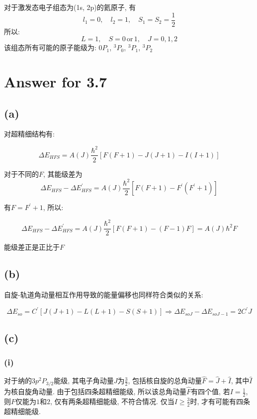 \documentclass[twoside]{article}
\begin{document}
对于激发态电子组态为(1s, 2p)的氦原子, 有
$$
    l_1 = 0, \quad l_2 = 1, \quad S_1 = S_2 = \frac{1}{2}
$$
所以:
$$
    L = 1, \quad S = 0\, \text{or} \, 1, \quad J = 0, 1, 2
$$
该组态所有可能的原子能级为: $0 P_{1}$, $^3 P_{0}$, $^3P_{1}$, $^3P_{2}$

\section*{Answer for 3.7}

\subsection*{(a)}

对超精细结构有:

$$\Delta E_{HFS} = A(J) \frac{\hbar^2}{2} \left[F(F+1) - J(J+1) - I(I+1)\right]$$

对于不同的$F$, 其能级差为
$$\Delta E_{HFS} - \Delta E_{HFS}^\prime =  A(J) \frac{\hbar^2}{2} \left[F(F+1) - F^\prime(F^\prime + 1)\right]$$

有$F = F^\prime + 1$, 所以:

$$\Delta E_{HFS} - \Delta E_{HFS}^\prime =  A(J) \frac{\hbar^2}{2} \left[F(F+1) - (F - 1)F\right] = A(J) \hbar^2 F $$

能级差正是正比于$F$

\subsection*{(b)}

自旋-轨道角动量相互作用导致的能量偏移也同样符合类似的关系:

$$\Delta E_{so} = C^\prime \left[J(J+1) - L(L+1) - S(S+1)\right] \Rightarrow \Delta E_{so J} - \Delta E_{so J-1} = 2 C^\prime J$$

\subsection*{(c)}

\subsubsection*{(i)}

对于纳的$3p ^2P_{3/2}$能级, 其电子角动量$J$为$\frac{3}{2}$, 包括核自旋的总角动量$\hat{F} = \hat{J} + \hat{I}$, 其中$\hat{I}$为核自旋角动量.
由于包括四条超精细能级, 所以该总角动量$\hat{F}$有四个值, 若$I = \frac{1}{2}$, 则$F$仅能为$1$和$2$, 仅有两条超精细能级, 不符合情况.
仅当$I \geqslant \frac{3}{2}$时, 才有可能有四条超精细能级.
\end{document}
